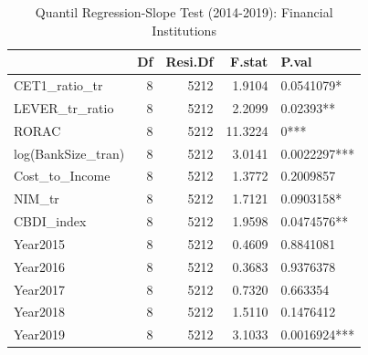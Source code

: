 \begin{table}[ht]
\centering
\caption{Quantil Regression-Slope Test (2014-2019): Financial Institutions} 
\begingroup\small
\begin{tabular}{lrrrl}
  \toprule
 & Df & Resi.Df & F.stat & P.val \\ 
  \midrule
CET1\_ratio\_tr & 8 & 5212 & 1.9104 & 0.0541079* \\ 
  LEVER\_tr\_ratio & 8 & 5212 & 2.2099 & 0.02393** \\ 
  RORAC & 8 & 5212 & 11.3224 & 0*** \\ 
  log(BankSize\_tran) & 8 & 5212 & 3.0141 & 0.0022297*** \\ 
  Cost\_to\_Income & 8 & 5212 & 1.3772 & 0.2009857 \\ 
  NIM\_tr & 8 & 5212 & 1.7121 & 0.0903158* \\ 
  CBDI\_index & 8 & 5212 & 1.9598 & 0.0474576** \\ 
  Year2015 & 8 & 5212 & 0.4609 & 0.8841081 \\ 
  Year2016 & 8 & 5212 & 0.3683 & 0.9376378 \\ 
  Year2017 & 8 & 5212 & 0.7320 & 0.663354 \\ 
  Year2018 & 8 & 5212 & 1.5110 & 0.1476412 \\ 
  Year2019 & 8 & 5212 & 3.1033 & 0.0016924*** \\ 
   \bottomrule
\end{tabular}
\endgroup
\end{table}
